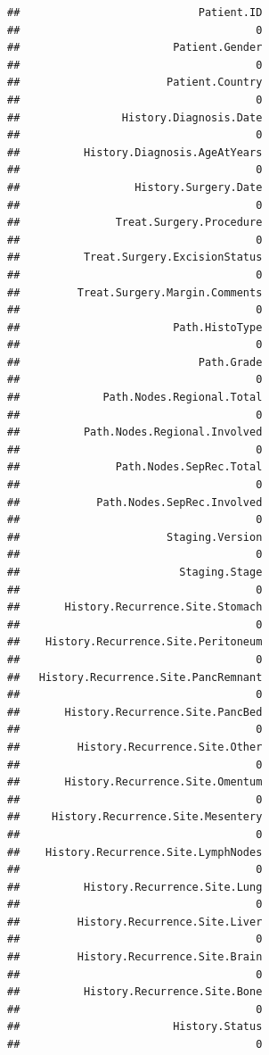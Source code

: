 \documentclass{article}\usepackage[]{graphicx}\usepackage[]{color}
\makeatletter
\newenvironment{kframe}{%
 \def\at@end@of@kframe{}%
 \ifinner\ifhmode%
  \def\at@end@of@kframe{\end{minipage}}%
  \begin{minipage}{\columnwidth}%
 \fi\fi%
 \def\FrameCommand##1{\hskip\@totalleftmargin \hskip-\fboxsep
 \colorbox{shadecolor}{##1}\hskip-\fboxsep
     \hskip-\linewidth \hskip-\@totalleftmargin \hskip\columnwidth}%
 \MakeFramed {\advance\hsize-\width
   \@totalleftmargin\z@ \linewidth\hsize
   \@setminipage}}%
 {\par\unskip\endMakeFramed%
 \at@end@of@kframe}
\newenvironment{knitrout}{}{} %
\makeatother
\begin{document}
\begin{knitrout}
\begin{kframe}
\begin{alltt}
\end{alltt}
\begin{verbatim}
##                            Patient.ID 
##                                     0 
##                        Patient.Gender 
##                                     0 
##                       Patient.Country 
##                                     0 
##                History.Diagnosis.Date 
##                                     0 
##          History.Diagnosis.AgeAtYears 
##                                     0 
##                  History.Surgery.Date 
##                                     0 
##               Treat.Surgery.Procedure 
##                                     0 
##          Treat.Surgery.ExcisionStatus 
##                                     0 
##         Treat.Surgery.Margin.Comments 
##                                     0 
##                        Path.HistoType 
##                                     0 
##                            Path.Grade 
##                                     0 
##             Path.Nodes.Regional.Total 
##                                     0 
##          Path.Nodes.Regional.Involved 
##                                     0 
##               Path.Nodes.SepRec.Total 
##                                     0 
##            Path.Nodes.SepRec.Involved 
##                                     0 
##                       Staging.Version 
##                                     0 
##                         Staging.Stage 
##                                     0 
##       History.Recurrence.Site.Stomach 
##                                     0 
##    History.Recurrence.Site.Peritoneum 
##                                     0 
##   History.Recurrence.Site.PancRemnant 
##                                     0 
##       History.Recurrence.Site.PancBed 
##                                     0 
##         History.Recurrence.Site.Other 
##                                     0 
##       History.Recurrence.Site.Omentum 
##                                     0 
##     History.Recurrence.Site.Mesentery 
##                                     0 
##    History.Recurrence.Site.LymphNodes 
##                                     0 
##          History.Recurrence.Site.Lung 
##                                     0 
##         History.Recurrence.Site.Liver 
##                                     0 
##         History.Recurrence.Site.Brain 
##                                     0 
##          History.Recurrence.Site.Bone 
##                                     0 
##                        History.Status 
##                                     0 

\end{verbatim}
\end{kframe}
\end{knitrout}
\end{document}
